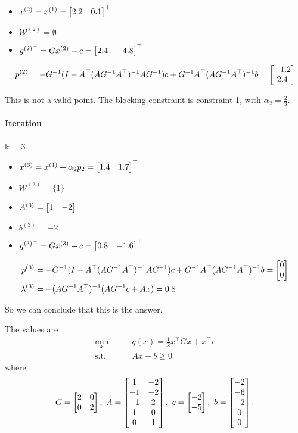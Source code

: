   \begin{itemize}
    \item $x^{(2)} = x^{(1)} = \begin{bmatrix} 2.2 & 0.1 \end{bmatrix}^{\top}$
    \item $\mathcal{W}^{(2)} = \emptyset$
    \item $g^{(2)\top} = Gx^{(2)} + c = \begin{bmatrix} 2.4 & -4.8 \end{bmatrix}^{\top}$
  \end{itemize}

  \begin{align*}
    p^{(2)} &= -G^{-1}(I - A^{\top}(AG^{-1}A^{\top})^{-1}AG^{-1})c + G^{-1}A^{\top}(AG^{-1}A^{\top})^{-1}b = \begin{bmatrix} -1.2 \\ 2.4 \end{bmatrix}  \\ 
  \end{align*}

This is not a valid point. The blocking constraint is constraint 1, with $\alpha_2 = \frac{2}{3}$.

\paragraph{Iteration} k = 3

\begin{itemize}
  \item $x^{(3)} = x^{(1)} + \alpha_2p_2 = \begin{bmatrix} 1.4 & 1.7 \end{bmatrix}^{\top}$
  \item $\mathcal{W}^{(3)} = \{1\}$
  \item $A^{(3)} = \begin{bmatrix} 1 & -2 \end{bmatrix}$
  \item $b^{(3)} = -2$
  \item $g^{(3)\top} = Gx^{(3)} + c = \begin{bmatrix} 0.8 & -1.6 \end{bmatrix}^{\top}$
\end{itemize}

\begin{align*}
  p^{(3)} &= -G^{-1}(I - A^{\top}(AG^{-1}A^{\top})^{-1}AG^{-1})c + G^{-1}A^{\top}(AG^{-1}A^{\top})^{-1}b = \begin{bmatrix} 0 \\ 0 \end{bmatrix}  \\ 
  \lambda^{(3)} &= -(AG^{-1}A^{\top})^{-1}(AG^{-1}c + Ax) = 0.8
\end{align*}

So we can conclude that this is the answer. 


The values are
\begin{align*}
  \min_x \qquad &q(x) = \frac{1}{2}x^{\top}Gx + x^{\top}c \\ 
  \text{s.t.}\qquad &Ax-b \geq 0
\end{align*}  
where
\[
  G = \begin{bmatrix} 2 & 0 \\ 0 & 2 \end{bmatrix},\ A = \begin{bmatrix} 1 & -2 \\ -1 & -2 \\ -1 & 2 \\ 1 & 0 \\ 0 & 1 \end{bmatrix},\ c = \begin{bmatrix} -2 \\ -5 \end{bmatrix},\ b = \begin{bmatrix} -2 \\ -6 \\ -2 \\ 0 \\ 0 \end{bmatrix}
.\] 

